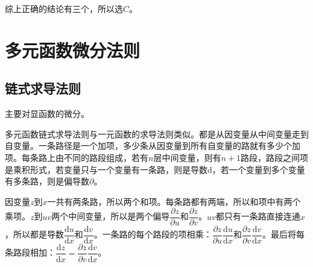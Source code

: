 综上正确的结论有三个，所以选$C$。

\section{多元函数微分法则}

\subsection{链式求导法则}

主要对显函数的微分。

多元函数链式求导法则与一元函数的求导法则类似。都是从因变量从中间变量走到自变量。一条路径是一个加项，多少条从因变量到所有自变量的路就有多少个加项。每条路上由不同的路段组成，若有$n$层中间变量，则有$n+1$路段，路段之间项是乘积形式，若变量只与一个变量有一条路，则是导数$\textrm{d}$，若一个变量到多个变量有多条路，则是偏导数$\partial$。

\begin{minipage}{0.65\linewidth}
    因变量$z$到$x$一共有两条路，所以两个和项。每条路都有两端，所以和项中有两个乘项。$z$到$uv$两个中间变量，所以是两个偏导$\dfrac{\partial z}{\partial u}$和$\dfrac{\partial z}{\partial v}$。$uv$都只有一条路直接连通$x$，所以都是导数$\dfrac{\textrm{d}u}{\textrm{d}x}$和$\dfrac{\textrm{d}v}{\textrm{d}x}$。一条路的每个路段的项相乘：$\dfrac{\partial z}{\partial u}\dfrac{\textrm{d}u}{\textrm{d}x}$和$\dfrac{\partial z}{\partial v}\dfrac{\textrm{d}v}{\textrm{d}x}$。最后将每条路段相加：$\dfrac{\textrm{d}z}{\textrm{d}x}=\dfrac{\partial z}{\partial v}\dfrac{\textrm{d}v}{\textrm{d}x}$。
\end{minipage}
\hfill
\begin{minipage}{0.25\linewidth}
\end{minipage} \medskip

